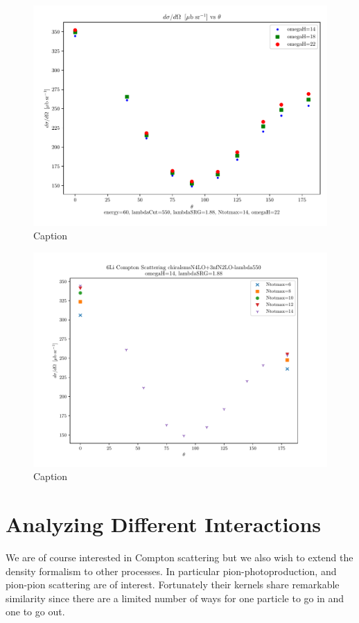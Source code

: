 \documentclass[a4paper,11pt]{article}
\begin{document}
\begin{figure}[H]
\centering
\includegraphics[scale=0.5]{6Li-omegaH-vary.pdf}
\caption{Caption}
\label{fig:label1}
\end{figure}

\begin{figure}[H]
\centering
\includegraphics[scale=0.5]{6Li-Ntotmax-vary-omegaH14.pdf}
\caption{Caption}
\label{fig:label2}
\end{figure}
\section{Analyzing Different Interactions}
We are of course interested in Compton scattering but we also wish to extend the density
formalism to other processes. In particular pion-photoproduction, and
pion-pion scattering are of interest.
Fortunately their kernels share remarkable similarity since there are
a limited number of ways for one particle to go in and one to go out.
\end{document}
